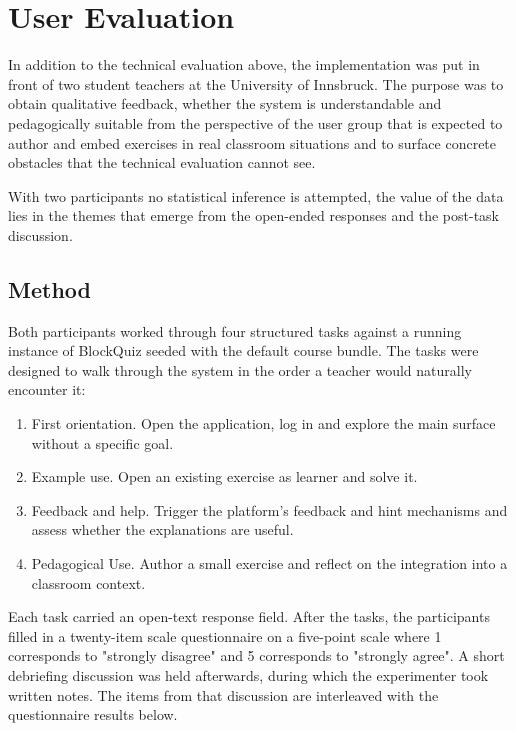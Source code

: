 \section{User Evaluation}
\label{sec:user-evaluation}
In addition to the technical evaluation above, the implementation was put in front of two student teachers at
the University of Innsbruck.
The purpose was to obtain qualitative feedback, whether the system is understandable and pedagogically suitable 
from the perspective of the user group that is expected to author and embed
exercises in real classroom situations and to surface concrete obstacles that the technical evaluation cannot see.

With two participants no statistical inference is attempted, the value of the data lies in the themes that emerge from the 
open-ended responses and the post-task discussion.

\subsection{Method}
Both participants worked through four structured tasks against a running instance of BlockQuiz seeded with 
the default course bundle. The tasks were designed to walk through the system in the order a teacher 
would naturally encounter it:
\begin{enumerate}
  \item First orientation. Open the application, log in and explore the main surface without a specific goal.
  \item Example use. Open an existing exercise as learner and solve it.
  \item Feedback and help. Trigger the platform's feedback and hint mechanisms and assess whether the explanations are useful.
  \item Pedagogical Use. Author a small exercise and reflect on the integration into a classroom context.
\end{enumerate}

Each task carried an open-text response field. After the tasks, the participants filled in a twenty-item scale 
questionnaire on a five-point scale where 1 corresponds to "strongly disagree" and 5 corresponds to "strongly agree".
A short debriefing discussion was held afterwards, during which the experimenter took written notes. 
The items from that discussion are interleaved with the questionnaire results below.

